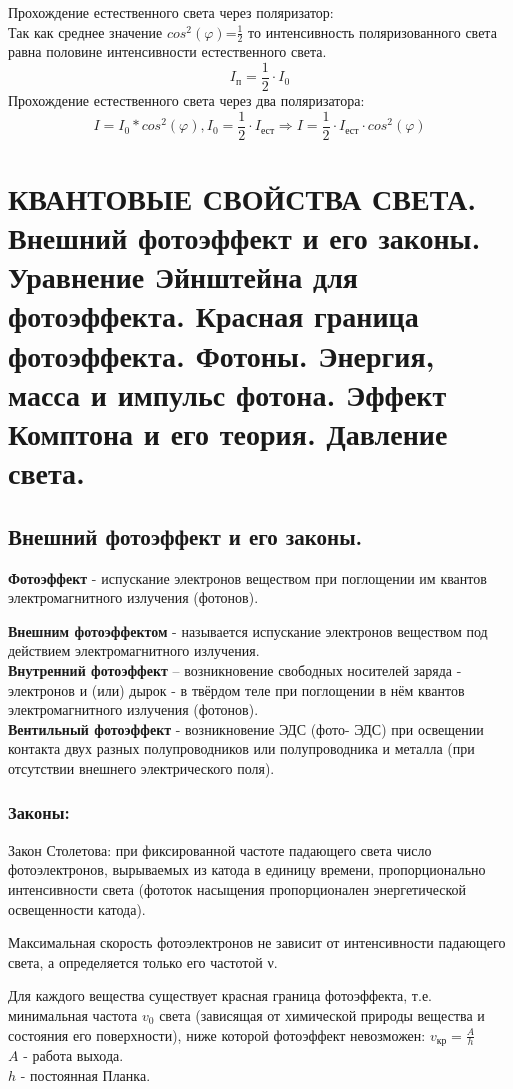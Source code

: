 \documentclass[12pt]{report}
\begin{document}
Прохождение естественного света через поляризатор:\\
Так как среднее значение $cos^2(\varphi)$=$\frac{1}{2}$ то интенсивность поляризованного света равна половине интенсивности естественного света.
\[
    I_\text{п}=\frac{1}{2} \cdot I_0
\]
Прохождение естественного света через два поляризатора:\\
\[
    I=I_0*cos^2(\varphi), I_0=\frac{1}{2}\cdot I_\text{ест} \Rightarrow{} I=\frac{1}{2}\cdot I_\text{ест} \cdot cos^2(\varphi)
\]
\section{КВАНТОВЫЕ СВОЙСТВА СВЕТА. Внешний фотоэффект и его законы. Уравнение Эйнштейна для фотоэффекта. Красная граница фотоэффекта. Фотоны. Энергия, масса и импульс фотона. Эффект Комптона и его теория. Давление света.}
\subsection{ Внешний фотоэффект и его законы.}
\textbf{Фотоэффект} - испускание электронов веществом при поглощении им квантов электромагнитного излучения (фотонов).

\textbf{Внешним фотоэффектом} - называется испускание
электронов веществом под действием электромагнитного
излучения.\\

\textbf{Внутренний фотоэффект} – возникновение свободных
носителей заряда - электронов и (или) дырок - в твёрдом
теле при поглощении в нём квантов электромагнитного
излучения (фотонов).\\

\textbf{Вентильный фотоэффект} - возникновение ЭДС (фото-
ЭДС) при освещении контакта двух разных полупроводников или полупроводника и металла (при отсутствии внешнего электрического поля).

\subsubsection{Законы:}
Закон Столетова: при фиксированной частоте падающего света число фотоэлектронов, вырываемых из катода в единицу времени, пропорционально интенсивности света (фототок насыщения пропорционален энергетической освещенности катода).

Максимальная скорость фотоэлектронов не зависит от интенсивности падающего света, а определяется только его частотой ν.

Для каждого вещества существует красная граница фотоэффекта, т.е. минимальная частота $v_0$ света (зависящая от химической природы вещества и состояния его поверхности), ниже которой фотоэффект невозможен: $v_\text{кр}=\frac{A}{h}$\\
$A$ - работа выхода.\\
$h$ - постоянная Планка.
\end{document}
